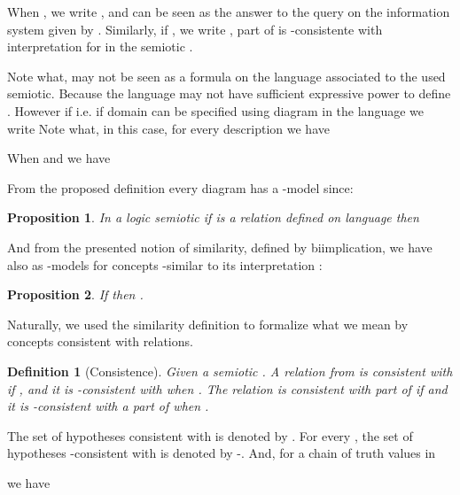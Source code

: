 \documentclass[oribibl]{llncs}
\newtheorem{prop}{Proposition}
\newtheorem{defn}{Definition}
\begin{document}
When , we write ,  and  can be seen as
the answer to the query  on the information system given by . Similarly, if , we write , part of  is -consistente with interpretation for  in the semiotic .

Note what,  may not be seen as a formula on the language associated to the used semiotic. Because the language may not have sufficient expressive power to define . However if  i.e. if domain  can be specified using diagram  in the language we write 
Note what, in this case, for every description  we have

When  and  we have



From the proposed definition every diagram has a -model since:

\begin{prop}
In a logic semiotic  if  is a relation defined on language  then

\end{prop}

And from the presented notion of similarity, defined by biimplication, we have also as -models for  concepts -similar to its interpretation :

\begin{prop}
If  then .
\end{prop}

Naturally, we used the similarity definition to formalize what we mean by concepts consistent with relations.

\begin{defn}[Consistence]
Given a semiotic . A relation  from  is
\emph{consistent with}  if , and it
is -\emph{consistent with}  when . The relation  is consistent with part of  if
 and it is -\emph{consistent with a
part of}  when .
\end{defn}

The set of hypotheses consistent with  is denoted by
. For every , the set of hypotheses
-consistent with  is denoted by
-. And, for a chain of truth values in 

we have
\end{document}
